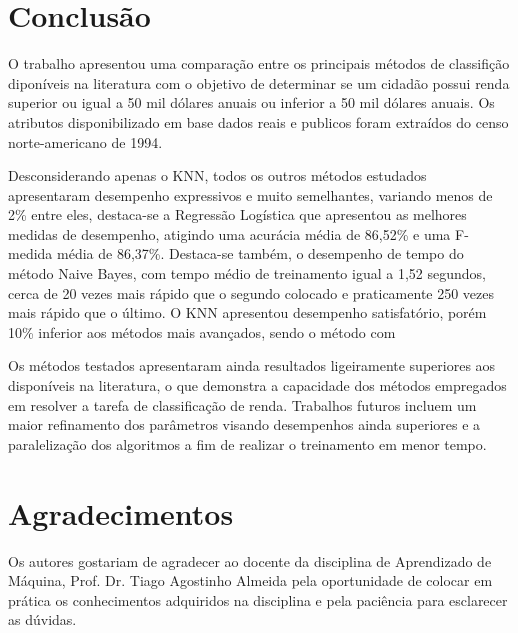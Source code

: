 \section{Conclusão}

O trabalho apresentou uma comparação entre os principais métodos de classifição diponíveis na literatura com o objetivo de determinar se um cidadão possui renda superior ou igual a 50 mil dólares anuais ou inferior a 50 mil dólares anuais. Os atributos disponibilizado em base dados reais e publicos foram extraídos do censo norte-americano de 1994.

Desconsiderando apenas o KNN, todos os outros métodos estudados apresentaram desempenho expressivos e muito semelhantes, variando menos de 2\% entre eles, destaca-se a Regressão Logística que apresentou as melhores medidas de desempenho, atigindo uma acurácia média de 86,52\% e uma F-medida média de 86,37\%. Destaca-se também, o desempenho de tempo do método Naive Bayes, com tempo médio de treinamento igual a 1,52 segundos, cerca de 20 vezes mais rápido que o segundo colocado e praticamente 250 vezes mais rápido que o último. O KNN apresentou desempenho satisfatório, porém 10\% inferior aos métodos mais avançados, sendo o método com 

Os métodos testados apresentaram ainda resultados ligeiramente superiores aos disponíveis na literatura, o que demonstra a capacidade dos métodos empregados em resolver a tarefa de classificação de renda. Trabalhos futuros incluem um maior refinamento dos parâmetros visando desempenhos ainda superiores e a paralelização dos algoritmos a fim de realizar o treinamento em menor tempo.




\section*{Agradecimentos}
Os autores gostariam de agradecer ao docente da disciplina de Aprendizado de Máquina, Prof. Dr. Tiago Agostinho Almeida pela oportunidade de colocar em prática os conhecimentos adquiridos na disciplina e pela paciência para esclarecer as dúvidas.